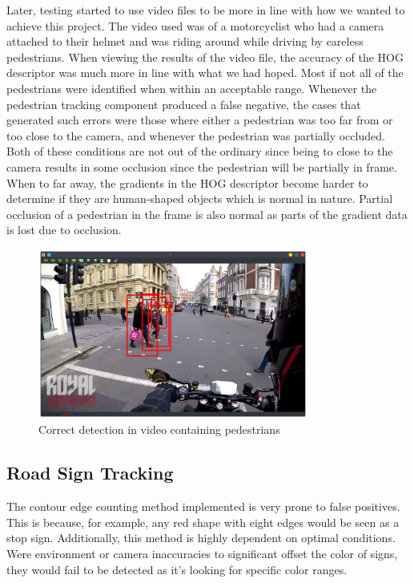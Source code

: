 Later, testing started to use video files to be more in line with how we wanted to achieve this project. The video used was of a motorcyclist who had a camera attached to their helmet and was riding around while driving by careless pedestrians. When viewing the results of the video file, the accuracy of the HOG descriptor was much more in line with what we had hoped. Most if not all of the pedestrians were identified when within an acceptable range. Whenever the pedestrian tracking component produced a false negative, the cases that generated such errors were those where either a pedestrian was too far from or too close to the camera, and whenever the pedestrian was partially occluded. Both of these conditions are not out of the ordinary since being to close to the camera results in some occlusion since the pedestrian will be partially in frame. When to far away, the gradients in the HOG descriptor become harder to determine if they are human-shaped objects which is normal in nature. Partial occlusion of a pedestrian in the frame is also normal as parts of the gradient data is lost due to occlusion.

\begin{figure}[H]
    \centering
    \includegraphics[width=3.5in]{figures/PT_video_correct.png}
    \caption{Correct detection in video containing pedestrians}
\end{figure}

\subsection{Road Sign Tracking}

The contour edge counting method implemented is very prone to false positives.
This is because, for example, any red shape with eight edges would be seen as a stop sign.
Additionally, this method is highly dependent on optimal conditions.
Were environment or camera inaccuracies to significant offset the color of signs, they would fail to be detected as it's looking for specific color ranges.


